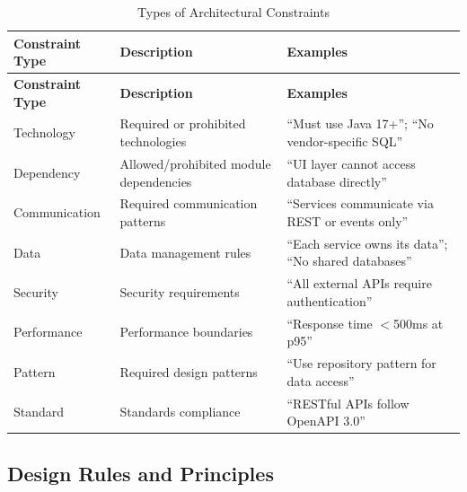 \documentclass[11pt]{article}
\begin{document}
\begin{longtable}{@{}L{3cm} L{4.5cm} L{5cm}@{}}
\caption{Types of Architectural Constraints} \\
\toprule
\textbf{Constraint Type} & \textbf{Description} & \textbf{Examples} \\
\midrule
\endfirsthead
\toprule
\textbf{Constraint Type} & \textbf{Description} & \textbf{Examples} \\
\midrule
\endhead
\bottomrule
\endlastfoot
Technology & Required or prohibited technologies & ``Must use Java 17+''; ``No vendor-specific SQL'' \\
Dependency & Allowed/prohibited module dependencies & ``UI layer cannot access database directly'' \\
Communication & Required communication patterns & ``Services communicate via REST or events only'' \\
Data & Data management rules & ``Each service owns its data''; ``No shared databases'' \\
Security & Security requirements & ``All external APIs require authentication'' \\
Performance & Performance boundaries & ``Response time $<$500ms at p95'' \\
Pattern & Required design patterns & ``Use repository pattern for data access'' \\
Standard & Standards compliance & ``RESTful APIs follow OpenAPI 3.0'' \\
\end{longtable}

\subsection{Design Rules and Principles}
\end{document}
